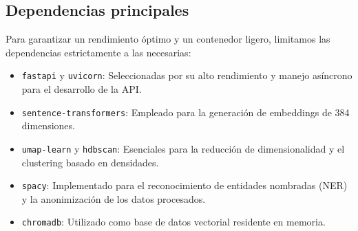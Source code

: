 \subsection{Dependencias principales}

Para garantizar un rendimiento óptimo y un contenedor ligero, limitamos las dependencias estrictamente a las necesarias:
\begin{itemize}
  \item \texttt{fastapi} y \texttt{uvicorn}: Seleccionadas por su alto rendimiento y manejo asíncrono para el desarrollo de la API.
  \item \texttt{sentence-transformers}: Empleado para la generación de embeddings de 384 dimensiones.
  \item \texttt{umap-learn} y \texttt{hdbscan}: Esenciales para la reducción de dimensionalidad y el clustering basado en densidades.
  \item \texttt{spacy}: Implementado para el reconocimiento de entidades nombradas (NER) y la anonimización de los datos procesados.
  \item \texttt{chromadb}: Utilizado como base de datos vectorial residente en memoria.
\end{itemize}
